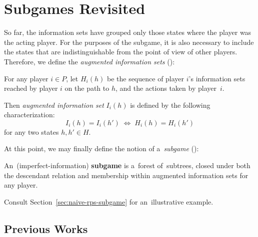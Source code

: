 \section{Subgames Revisited}

So far, the information sets have grouped only those states where the player was the acting player.
For the purposes of the subgame, it is also necessary to include the states that are indistinguishable from the point of view of other players.
Therefore, we define the \emph{augmented information sets} (\cite{BurchJohansonBowling13}):
\begin{defn}
  For any player $i \in P$, let $H_i(h)$ be the sequence of player $i$'s information sets reached by player $i$ on the path to $h$, and the actions taken by player~$i$.

  Then \emph{augmented information set} $I_i(h)$ is defined by the following characterization:
  \[ I_i (h) = I_i (h') \; \Longleftrightarrow \; H_i (h) = H_i (h') \]
  for any two states $h, h' \in H$.
\end{defn}
At this point, we may finally define the notion of a~\emph{subgame} (\cite{BurchJohansonBowling13}):
\begin{defn}[subgame]
  \label{defn:subgame}
  An~(imperfect-information) \textbf{subgame} is a~forest of~subtrees, closed under both the descendant relation and membership within augmented information sets for any player.
\end{defn}
Consult Section~\ref{sec:naive-rps-subgame} for an~illustrative example.

\subsection{Previous Works}
